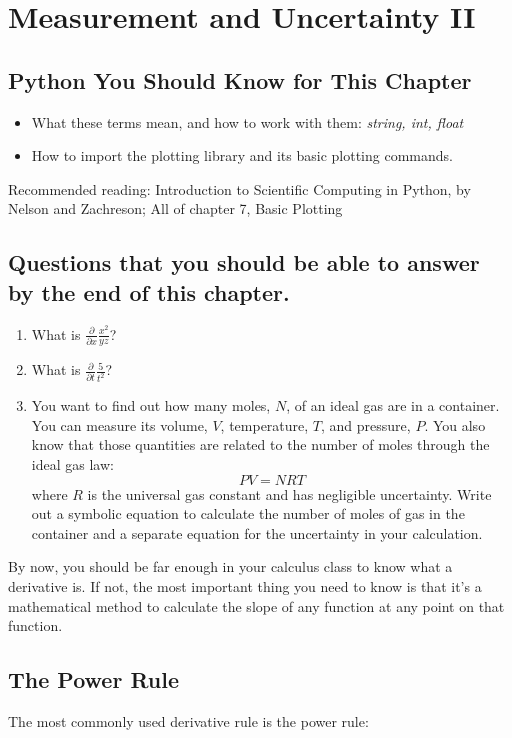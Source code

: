 \documentclass[twoside,11pt,ShortChapTitles]{BYUTextbook}
\begin{document}
\chapter{Measurement and Uncertainty II}
\section*{Python You Should Know for This Chapter}
\begin{itemize}
\item What these terms mean, and how to work with them: {\em string, int, float}
\item How to import the  plotting library and its basic plotting commands.
\end{itemize}
Recommended reading: Introduction to Scientific Computing in Python, by Nelson and Zachreson; All of chapter 7, Basic Plotting
\section*{Questions that you should be able to answer by the end of this chapter.}
\begin{enumerate}
\item What is $\frac{\partial}{\partial x} \frac{x^2}{yz}$?
\item What is $\frac{\partial}{\partial t} \frac{5}{t^2}$?
\item You want to find out how many moles, $N$, of an ideal gas are in a container.  You can measure its volume, $V$, temperature, $T$, and pressure, $P$.  You also know that those quantities are related to the number of moles through the ideal gas law:
\[PV=NRT\]
where $R$ is the universal gas constant and has negligible uncertainty.  Write out a symbolic equation to calculate the number of moles of gas in the container and a separate equation for the uncertainty in your calculation.
\end{enumerate}
\hrulefill


By now, you should be far enough in your calculus class to know what a derivative is.  If not, the most important thing you need to know is that it's a mathematical method to calculate the slope of any function at any point on that function.

\section{The Power Rule}
The most commonly used derivative rule is the power rule:
\end{document}
